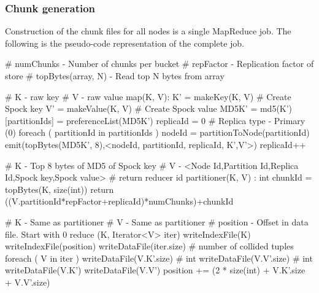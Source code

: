 \documentclass[10pt,twocolumn,preprint,natbib,authoryear]{sigplanconf}
\begin{document}

\subsubsection{Chunk generation}
\label{sec:read_only:chunk_generation}

Construction of the chunk files for all \projectname{} nodes is a single MapReduce job. The following is the pseudo-code representation of the complete job. 

\scriptsize
\label{MapReduce for Chunk generation}
\begin{verbatimtab}
# numChunks - Number of chunks per bucket
# repFactor - Replication factor of store
# topBytes(array, N) - Read top N bytes from array

# K - raw key
# V - raw value
map(K, V):
  K' = makeKey(K, V)     	# Create Spock key
  V' = makeValue(K, V)   	# Create Spock value
  MD5K' = md5(K')
  [partitionIds] = preferenceList(MD5K')
  replicaId = 0			# Replica type - Primary (0)
  foreach ( partitionId in partitionIds )
    nodeId = partitionToNode(partitionId)
    emit(topBytes(MD5K', 8),<nodeId, partitionId, replicaId, K',V'>) 
    replicaId++     

# K - Top 8 bytes of MD5 of Spock key
# V - <Node Id,Partition Id,Replica Id,Spock key,Spock value>
# return reducer id
partitioner(K, V) : int
  chunkId = topBytes(K, size(int)) %
  return ((V.partitionId*repFactor+replicaId)*numChunks)+chunkId
 
# K - Same as partitioner
# V - Same as partitioner
# position - Offset in data file. Start with 0
reduce (K, Iterator<V> iter)
  writeIndexFile(K)
  writeIndexFile(position)
  writeDataFile(iter.size)   # number of collided tuples
  foreach ( V in iter )
    writeDataFile(V.K'.size) # int
    writeDataFile(V.V'.size) # int
    writeDataFile(V.K')
    writeDataFile(V.V')
    position += (2 * size(int) + V.K'.size + V.V'.size)
\end{verbatimtab}
\normalsize
\end{document}

